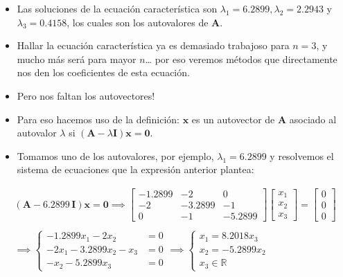 \documentclass[openany]{book}
\begin{document}
\begin{itemize}
\item
  Las soluciones de la ecuación característica son \(\lambda_1 = 6.2899, \lambda_2 = 2.2943\) y \(\lambda_3 = 0.4158\), los cuales son los autovalores de \(\textbf{A}\).
\item
  Hallar la ecuación característica ya es demasiado trabajoso para \(n=3\), y mucho más será para mayor \(n\)\ldots{} por eso veremos métodos que directamente nos den los coeficientes de esta ecuación.
\item
  Pero nos faltan los autovectores!
\item
  Para eso hacemos uso de la definición: \(\textbf{x}\) es un autovector de \(\textbf{A}\) asociado al autovalor \(\lambda\) si \((\textbf{A} - \lambda \textbf{I}) \textbf{x} = \textbf{0}\).
\item
  Tomamos uno de los autovalores, por ejemplo, \(\lambda_1 = 6.2899\) y resolvemos el sistema de ecuaciones que la expresión anterior plantea:
\end{itemize}

\begin{gather*}
(\textbf{A} - 6.2899 \, \textbf{I}) \textbf{x} = \textbf{0} \implies 
\begin{bmatrix}
    -1.2899 & -2 & 0 \\ 
    -2 & -3.2899 & -1 \\
    0 & -1 & -5.2899
\end{bmatrix}
\begin{bmatrix}
    x_1 \\ x_2 \\ x_3
\end{bmatrix} 
=
\begin{bmatrix}
    0 \\ 0 \\ 0
\end{bmatrix}
\\ \\
\implies
\begin{cases}
-1.2899 x_1 -2 x_2 &= 0 \\
-2 x_1 - 3.2899 x_2 - x_3 &= 0\\
-x_2 - 5.2899 x_3 &= 0
\end{cases} \implies
\begin{cases}
    x_1 = 8.2018 x_3\\
    x_2 = -5.2899 x_2\\
    x_3 \in \mathbb{R} 
\end{cases}
\end{gather*}
\end{document}
